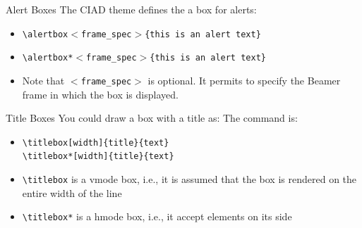 \documentclass[english,sectioncirclenumberstyle]{ciadbeamer}
\begin{document}
\begin{frame}{Alert Boxes}
	The CIAD theme defines the a box for alerts: \\
	\begin{itemize}
	\item \texttt{{\textbackslash}alertbox\ensuremath{<}frame\_spec\ensuremath{>}\{this is an alert text\}} \\[.5cm]
		\vspace{1cm}
	\item \texttt{{\textbackslash}alertbox*\ensuremath{<}frame\_spec\ensuremath{>}\{this is an alert text\}} \\[.5cm]
	\item Note that \texttt{\ensuremath{<}frame\_spec\ensuremath{>}} is optional. It permits to specify the Beamer frame in which the box is displayed.
	\end{itemize}
\end{frame}

\begin{frame}{Title Boxes}
	You could draw a box with a title as:
	The command is:	
	\begin{itemize}
	\item \texttt{{\textbackslash}titlebox[width]\{title\}\{text\}} \\
		\texttt{{\textbackslash}titlebox*[width]\{title\}\{text\}} \\[.5cm]
	\item \texttt{{\textbackslash}titlebox} is a vmode box, i.e., it is assumed that the box is rendered on the entire width of the line
	\item \texttt{{\textbackslash}titlebox*} is a hmode box, i.e., it accept elements on its side
	\end{itemize}
\end{frame}
\end{document}
